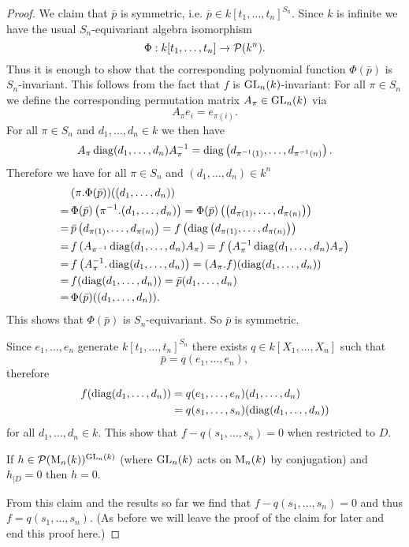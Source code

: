 \begin{proof}
 We claim that $\bar{p}$ is symmetric, i.e. $\bar{p} \in k[t_1, \ldots, t_n]^{S_n}$. Since $k$ is infinite we have the usual $S_n$-equivariant algebra isomorphism
 \[
 \Phi: k[t_1, \ldots, t_n] \to \mathcal{P}(k^n).
 \]
 Thus it is enough to show that the corresponding polynomial function $\Phi(\bar{p})$ is $S_n$-invariant. This follows from the fact that $f$ is $\operatorname{GL}_n(k)$-invariant: For all $\pi \in S_n$ we define the corresponding permutation matrix $A_\pi \in \operatorname{GL}_n(k)$ via
 \[
  A_\pi e_i = e_{\pi(i)}.
 \]
 For all $\pi \in S_n$ and $d_1, \ldots, d_n \in k$ we then have
 \[
  A_\pi \operatorname{diag}(d_1, \ldots, d_n) A_\pi^{-1}
  = \operatorname{diag}\left(d_{\pi^{-1}(1)}, \ldots, d_{\pi^{-1}(n)}\right).
 \]
 Therefore we have for all $\pi \in S_n$ and $(d_1, \ldots, d_n) \in k^n$
 \begin{align*}
  &\,(\pi.\Phi(\bar{p}))((d_1, \ldots, d_n)) \\
  =&\, \Phi(\bar{p})\left(\pi^{-1}.(d_1, \ldots, d_n)\right)
  = \Phi(\bar{p})\left(\left(d_{\pi(1)}, \ldots, d_{\pi(n)}\right)\right) \\
  =&\, \bar{p}\left(d_{\pi(1)}, \ldots, d_{\pi(n)}\right)
  = f\left(\operatorname{diag}\left(d_{\pi(1)}, \ldots, d_{\pi(n)}\right)\right) \\
  =&\, f\left(A_{\pi^{-1}} \operatorname{diag}(d_1, \ldots, d_n) A_\pi\right)
  = f\left(A_\pi^{-1} \operatorname{diag}(d_1, \ldots, d_n) A_\pi\right) \\
  =&\, f\left(A_\pi^{-1}.\operatorname{diag}(d_1, \ldots, d_n)\right)
  = (A_\pi.f)(\operatorname{diag}(d_1, \ldots, d_n)) \\
  =&\, f(\operatorname{diag}(d_1, \ldots, d_n))
  = \bar{p}(d_1, \ldots, d_n) \\
  =&\, \Phi(\bar{p})((d_1, \ldots, d_n)).
 \end{align*}
 This shows that $\Phi(\bar{p})$ is $S_n$-equivariant. So $\bar{p}$ is symmetric.
 
 Since $e_1, \ldots, e_n$ generate $k[t_1, \ldots, t_n]^{S_n}$ there exists $q \in k[X_1, \ldots, X_n]$ such that
 \[
  \bar{p} = q(e_1, \ldots, e_n),
 \]
 therefore
 \begin{align*}
  f(\operatorname{diag}(d_1, \ldots, d_n))
  &= q(e_1, \ldots, e_n)(d_1, \ldots, d_n) \\
  &= q(s_1, \ldots, s_n)(\operatorname{diag}(d_1, \ldots, d_n))
 \end{align*}
 for all $d_1, \ldots, d_n \in k$. This show that $f-q(s_1, \ldots, s_n) = 0$ when restricted to $D$.
 
 \begin{claim}
  If $h \in \mathcal{P}(\operatorname{M}_n(k))^{\operatorname{GL}_n(k)}$ (where $\operatorname{GL}_n(k)$ acts on $\operatorname{M}_n(k)$ by conjugation) and $h_{|D} = 0$ then $h = 0$.
 \end{claim}

 From this claim and the results so far we find that $f - q(s_1, \ldots, s_n) = 0$ and thus $f = q(s_1, \ldots, s_n)$. (As before we will leave the proof of the claim for later and end this proof here.)
\end{proof}











